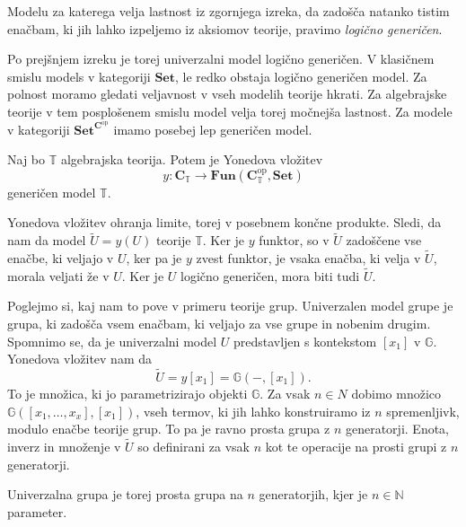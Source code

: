 \documentclass[../kategoricna_logika.tex]{subfiles}
\begin{document}
\begin{definicija}
  Modelu za katerega velja lastnost iz zgornjega izreka, da zadošča
  natanko tistim enačbam, ki jih lahko izpeljemo iz aksiomov teorije,
  pravimo \emph{logično generičen}.
\end{definicija}
Po prejšnjem izreku je torej univerzalni model logično generičen.
V klasičnem smislu models v kategoriji $\mathbf{Set}$, le redko obstaja
logično generičen model. Za polnost moramo gledati veljavnost
v vseh modelih teorije hkrati. Za algebrajske teorije v tem posplošenem
smislu model velja torej močnejša lastnost.
Za modele v kategoriji $\mathbf{Set}^{\mathbf{C}^{\mathrm{op}}}$
imamo posebej lep generičen model.
\begin{trditev}
  Naj bo $\mathbb{T}$ algebrajska teorija. Potem je Yonedova vložitev
  \[ y : \mathbf{C}_{\mathbb{T}} \to \mathbf{Fun}(\mathbf{C}_{\mathbb{T}}^{\mathrm{op}}, \mathbf{Set}) \]
  generičen model $\mathbb{T}$.
\end{trditev}
\begin{dokaz}
  Yonedova vložitev ohranja limite, torej v posebnem končne produkte.
  Sledi, da nam da model $\tilde{U} = y(U)$ teorije $\mathbb{T}$.
  Ker je $y$ funktor, so v $\tilde{U}$ zadoščene vse enačbe,
  ki veljajo v $U$, ker pa je $y$ zvest funktor, je vsaka enačba,
  ki velja v $\tilde{U}$, morala veljati že v $U$.
  Ker je $U$ logično generičen, mora biti tudi $\tilde{U}$.
\end{dokaz}
\begin{primer}
  Poglejmo si, kaj nam to pove v primeru teorije grup. Univerzalen model
  grupe je grupa, ki zadošča vsem enačbam, ki veljajo za vse grupe
  in nobenim drugim. Spomnimo se, da je univerzalni model $U$
  predstavljen s kontekstom $[x_1]$ v $\mathbb{G}$.
  Yonedova vložitev nam da
  \[ \tilde{U} = y[x_1] = \mathbb{G}(-, [x_1]). \]
  To je množica, ki jo parametrizirajo objekti $\mathbb{G}$.
  Za vsak $n \in \mathbb{}N$ dobimo množico $\mathbb{G}([x_1, \ldots, x_x], [x_1])$,
  vseh termov, ki jih lahko konstruiramo iz $n$ spremenljivk,
  modulo enačbe teorije grup.
  To pa je ravno prosta grupa z $n$ generatorji. Enota, inverz in množenje
  v $\tilde{U}$ so definirani za vsak $n$ kot te operacije na
  prosti grupi z $n$ generatorji.

  Univerzalna grupa je torej prosta grupa na $n$ generatorjih,
  kjer je $n \in \mathbb{N}$ parameter.
\end{primer}
%
\end{document}
